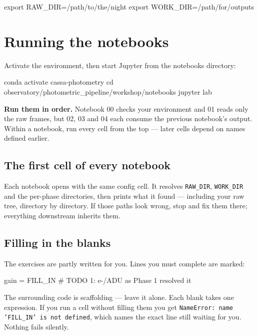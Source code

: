 \documentclass[11pt,a4paper]{article}
\newcommand{\cm}[1]{\texttt{\small #1}}
\newcommand{\cmt}[1]{\textcolor{inkfaint}{#1}}
\begin{document}
\begin{cmd}
\begin{cmdtext}
export RAW_DIR=/path/to/the/night
export WORK_DIR=/path/for/outputs
\end{cmdtext}
\end{cmd}

\section{Running the notebooks}
Activate the environment, then start Jupyter from the notebooks directory:

\begin{cmd}
\begin{cmdtext}
conda activate cassa-photometry
cd observatory/photometric_pipeline/workshop/notebooks
jupyter lab
\end{cmdtext}
\end{cmd}

\textbf{Run them in order.} Notebook 00 checks your environment and 01 reads only the raw
frames, but 02, 03 and 04 each consume the previous notebook's output. Within a notebook, run
every cell from the top --- later cells depend on names defined earlier.

\subsection{The first cell of every notebook}
Each notebook opens with the same config cell. It resolves \cm{RAW\_DIR}, \cm{WORK\_DIR} and
the per-phase directories, then prints what it found --- including your raw tree, directory by
directory. If those paths look wrong, stop and fix them there; everything downstream inherits
them.

\subsection{Filling in the blanks}
The exercises are partly written for you. Lines you must complete are marked:

\begin{cmd}
\begin{cmdtext}
gain = FILL_IN        \cmt{# TODO 1: e-/ADU as Phase 1 resolved it}
\end{cmdtext}
\end{cmd}

The surrounding code is scaffolding --- leave it alone. Each blank takes one expression. If you
run a cell without filling them you get \cm{NameError: name 'FILL\_IN' is not defined}, which
names the exact line still waiting for you. Nothing fails silently.
\end{document}
